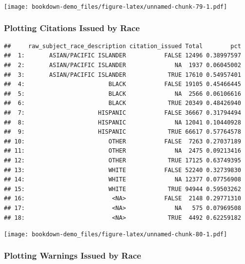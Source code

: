 \documentclass[
]{book}
\begin{document}
\texttt{[image: bookdown-demo\_files/figure-latex/unnamed-chunk-79-1.pdf]}

\hypertarget{plotting-citations-issued-by-race}{%
\subsubsection{Plotting Citations Issued by Race}\label{plotting-citations-issued-by-race}}

\begin{verbatim}
##     raw_subject_race_description citation_issued Total        pct
##  1:       ASIAN/PACIFIC ISLANDER           FALSE 12496 0.38997597
##  2:       ASIAN/PACIFIC ISLANDER              NA  1937 0.06045002
##  3:       ASIAN/PACIFIC ISLANDER            TRUE 17610 0.54957401
##  4:                        BLACK           FALSE 19105 0.45466445
##  5:                        BLACK              NA  2566 0.06106616
##  6:                        BLACK            TRUE 20349 0.48426940
##  7:                     HISPANIC           FALSE 36667 0.31794494
##  8:                     HISPANIC              NA 12041 0.10440928
##  9:                     HISPANIC            TRUE 66617 0.57764578
## 10:                        OTHER           FALSE  7263 0.27037189
## 11:                        OTHER              NA  2475 0.09213416
## 12:                        OTHER            TRUE 17125 0.63749395
## 13:                        WHITE           FALSE 52240 0.32739830
## 14:                        WHITE              NA 12377 0.07756908
## 15:                        WHITE            TRUE 94944 0.59503262
## 16:                         <NA>           FALSE  2148 0.29771310
## 17:                         <NA>              NA   575 0.07969508
## 18:                         <NA>            TRUE  4492 0.62259182
\end{verbatim}

\texttt{[image: bookdown-demo\_files/figure-latex/unnamed-chunk-80-1.pdf]}

\hypertarget{plotting-warnings-issued-by-race}{%
\subsubsection{Plotting Warnings Issued by Race}\label{plotting-warnings-issued-by-race}}
\end{document}
